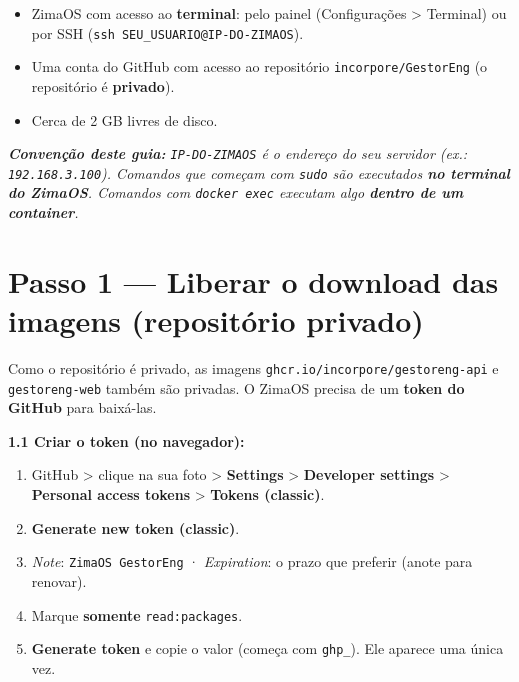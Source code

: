 \documentclass[
  10pt,
]{article}
\providecommand{\tightlist}{%
  \setlength{\itemsep}{0pt}\setlength{\parskip}{0pt}}
\renewenvironment{quote}{\begin{oldquote}\small\itshape}{\end{oldquote}}
\begin{document}
\begin{itemize}
\tightlist
\item
  ZimaOS com acesso ao \textbf{terminal}: pelo painel (Configurações
  \textgreater{} Terminal) ou por SSH
  (\texttt{ssh\ SEU\_USUARIO@IP-DO-ZIMAOS}).
\item
  Uma conta do GitHub com acesso ao repositório
  \texttt{incorpore/GestorEng} (o repositório é \textbf{privado}).
\item
  Cerca de 2 GB livres de disco.
\end{itemize}

\begin{quote}
\textbf{Convenção deste guia:} \texttt{IP-DO-ZIMAOS} é o endereço do seu
servidor (ex.: \texttt{192.168.3.100}). Comandos que começam com
\texttt{sudo} são executados \textbf{no terminal do ZimaOS}. Comandos
com \texttt{docker\ exec} executam algo \textbf{dentro de um container}.
\end{quote}

\hypertarget{passo-1-liberar-o-download-das-imagens-reposituxf3rio-privado}{%
\section{Passo 1 --- Liberar o download das imagens (repositório
privado)}\label{passo-1-liberar-o-download-das-imagens-reposituxf3rio-privado}}

Como o repositório é privado, as imagens
\texttt{ghcr.io/incorpore/gestoreng-api} e \texttt{gestoreng-web} também
são privadas. O ZimaOS precisa de um \textbf{token do GitHub} para
baixá-las.

\textbf{1.1 Criar o token (no navegador):}

\begin{enumerate}
\def\labelenumi{\arabic{enumi}.}
\tightlist
\item
  GitHub \textgreater{} clique na sua foto \textgreater{}
  \textbf{Settings} \textgreater{} \textbf{Developer settings}
  \textgreater{} \textbf{Personal access tokens} \textgreater{}
  \textbf{Tokens (classic)}.
\item
  \textbf{Generate new token (classic)}.
\item
  \emph{Note}: \texttt{ZimaOS\ GestorEng} · \emph{Expiration}: o prazo
  que preferir (anote para renovar).
\item
  Marque \textbf{somente} \texttt{read:packages}.
\item
  \textbf{Generate token} e copie o valor (começa com \texttt{ghp\_}).
  Ele aparece uma única vez.
\end{enumerate}
\end{document}
